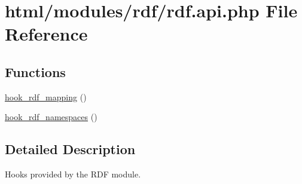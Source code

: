 \hypertarget{rdf_8api_8php}{
\section{html/modules/rdf/rdf.api.php File Reference}
\label{rdf_8api_8php}
}
\subsection*{Functions}
\begin{DoxyCompactItemize}
\item 
\hyperlink{group__rdf_gae3e7f047bdcb9309b323e2af09966765}{hook\_\-rdf\_\-mapping} ()
\item 
\hyperlink{group__rdf_ga32e59c5e172304a5f49ec7d76ee6bf3b}{hook\_\-rdf\_\-namespaces} ()
\end{DoxyCompactItemize}


\subsection{Detailed Description}
Hooks provided by the RDF module. 